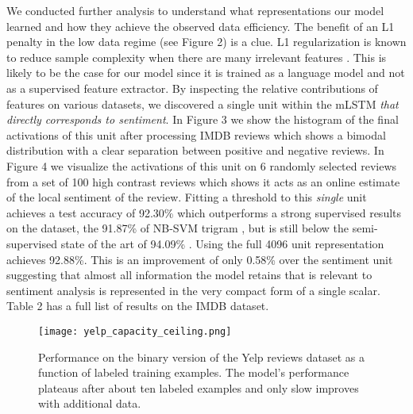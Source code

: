 \documentclass{article}
\begin{document}
We conducted further analysis to understand what representations our model learned and how they achieve the observed data efficiency. The benefit of an L1 penalty in the low data regime (see Figure 2) is a clue. L1 regularization is known to reduce sample complexity when there are many irrelevant features \cite{ng2004feature}. This is likely to be the case for our model since it is trained as a language model and not as a supervised feature extractor. By inspecting the relative contributions of features on various datasets, we discovered a single unit within the mLSTM \textit{that directly corresponds to sentiment}. In Figure 3 we show the histogram of the final activations of this unit after processing IMDB reviews \cite{maas2011learning} which shows a bimodal distribution with a clear separation between positive and negative reviews. In Figure 4 we visualize the activations of this unit on 6 randomly selected reviews from a set of 100 high contrast reviews which shows it acts as an online estimate of the local sentiment of the review. Fitting a threshold to this \textit{single} unit achieves a test accuracy of 92.30\% which outperforms a strong supervised results on the dataset, the 91.87\% of NB-SVM trigram \cite{mesnil2014ensemble}, but is still below the semi-supervised state of the art of 94.09\% \cite{miyato2016adversarial}. Using the full 4096 unit representation achieves 92.88\%. This is an improvement of only 0.58\% over the sentiment unit suggesting that almost all information the model retains that is relevant to sentiment analysis is represented in the very compact form of a single scalar. Table 2 has a full list of results on the IMDB dataset.

\begin{figure}[h]
\vskip 0.2in
\begin{center}
\centerline{\texttt{[image: yelp\_capacity\_ceiling.png]}}
\caption{Performance on the binary version of the Yelp reviews dataset as a function of labeled training examples. The model's performance plateaus after about ten labeled examples and only slow improves with additional data.}
\label{capacity ceiling}
\end{center}
\vskip -0.2in
\end{figure} 
\end{document}
